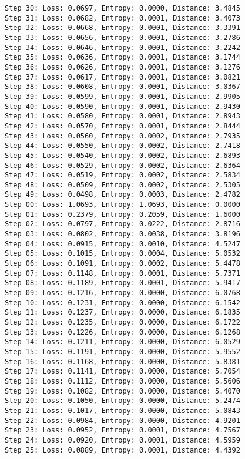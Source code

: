 \documentclass[11pt]{article}
\begin{document}
\begin{Verbatim}[commandchars=\\\{\}]
Step 30: Loss: 0.0697, Entropy: 0.0000, Distance: 3.4845
Step 31: Loss: 0.0682, Entropy: 0.0001, Distance: 3.4073
Step 32: Loss: 0.0668, Entropy: 0.0001, Distance: 3.3391
Step 33: Loss: 0.0656, Entropy: 0.0001, Distance: 3.2786
Step 34: Loss: 0.0646, Entropy: 0.0001, Distance: 3.2242
Step 35: Loss: 0.0636, Entropy: 0.0001, Distance: 3.1744
Step 36: Loss: 0.0626, Entropy: 0.0001, Distance: 3.1276
Step 37: Loss: 0.0617, Entropy: 0.0001, Distance: 3.0821
Step 38: Loss: 0.0608, Entropy: 0.0001, Distance: 3.0367
Step 39: Loss: 0.0599, Entropy: 0.0001, Distance: 2.9905
Step 40: Loss: 0.0590, Entropy: 0.0001, Distance: 2.9430
Step 41: Loss: 0.0580, Entropy: 0.0001, Distance: 2.8943
Step 42: Loss: 0.0570, Entropy: 0.0001, Distance: 2.8444
Step 43: Loss: 0.0560, Entropy: 0.0002, Distance: 2.7935
Step 44: Loss: 0.0550, Entropy: 0.0002, Distance: 2.7418
Step 45: Loss: 0.0540, Entropy: 0.0002, Distance: 2.6893
Step 46: Loss: 0.0529, Entropy: 0.0002, Distance: 2.6364
Step 47: Loss: 0.0519, Entropy: 0.0002, Distance: 2.5834
Step 48: Loss: 0.0509, Entropy: 0.0002, Distance: 2.5305
Step 49: Loss: 0.0498, Entropy: 0.0003, Distance: 2.4782
Step 00: Loss: 1.0693, Entropy: 1.0693, Distance: 0.0000
Step 01: Loss: 0.2379, Entropy: 0.2059, Distance: 1.6000
Step 02: Loss: 0.0797, Entropy: 0.0222, Distance: 2.8716
Step 03: Loss: 0.0802, Entropy: 0.0038, Distance: 3.8196
Step 04: Loss: 0.0915, Entropy: 0.0010, Distance: 4.5247
Step 05: Loss: 0.1015, Entropy: 0.0004, Distance: 5.0532
Step 06: Loss: 0.1091, Entropy: 0.0002, Distance: 5.4478
Step 07: Loss: 0.1148, Entropy: 0.0001, Distance: 5.7371
Step 08: Loss: 0.1189, Entropy: 0.0001, Distance: 5.9417
Step 09: Loss: 0.1216, Entropy: 0.0000, Distance: 6.0768
Step 10: Loss: 0.1231, Entropy: 0.0000, Distance: 6.1542
Step 11: Loss: 0.1237, Entropy: 0.0000, Distance: 6.1835
Step 12: Loss: 0.1235, Entropy: 0.0000, Distance: 6.1722
Step 13: Loss: 0.1226, Entropy: 0.0000, Distance: 6.1268
Step 14: Loss: 0.1211, Entropy: 0.0000, Distance: 6.0529
Step 15: Loss: 0.1191, Entropy: 0.0000, Distance: 5.9552
Step 16: Loss: 0.1168, Entropy: 0.0000, Distance: 5.8381
Step 17: Loss: 0.1141, Entropy: 0.0000, Distance: 5.7054
Step 18: Loss: 0.1112, Entropy: 0.0000, Distance: 5.5606
Step 19: Loss: 0.1082, Entropy: 0.0000, Distance: 5.4070
Step 20: Loss: 0.1050, Entropy: 0.0000, Distance: 5.2474
Step 21: Loss: 0.1017, Entropy: 0.0000, Distance: 5.0843
Step 22: Loss: 0.0984, Entropy: 0.0000, Distance: 4.9201
Step 23: Loss: 0.0952, Entropy: 0.0001, Distance: 4.7567
Step 24: Loss: 0.0920, Entropy: 0.0001, Distance: 4.5959
Step 25: Loss: 0.0889, Entropy: 0.0001, Distance: 4.4392

\end{Verbatim}
\end{document}
